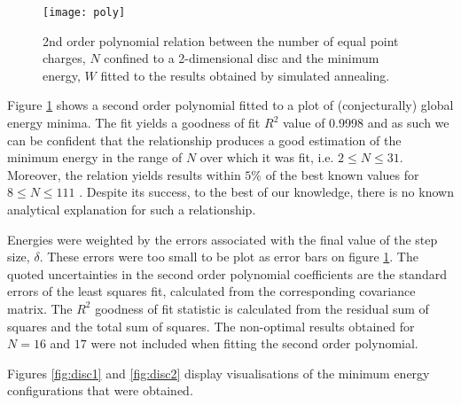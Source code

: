\documentclass[12pt,a4paper,final]{iopart}
\begin{document}
{\begin{figure}\label{fig:polyplot}
\centering
\texttt{[image: poly]}
\caption{2nd order polynomial relation between the number of equal point charges, $N$ confined to a 2-dimensional disc and the minimum energy, $W$ fitted to the results obtained by simulated annealing.} 
\end{figure}

Figure \ref{fig:polyplot} shows a second order polynomial fitted to a plot of (conjecturally) global energy minima.
The fit yields a goodness of fit $R^2$ value of 0.9998 and as such we can be confident that the relationship produces a good estimation of the minimum energy in the range of $N$ over which it was fit, i.e. $2 \leq N \leq 31$. Moreover, the relation  yields results within $5\%$ of the best known values for $ 8 \leq N \leq 111$ \cite{oymak01, worley06,nurmela98}. Despite its success, to the best of our knowledge, there is no known analytical explanation for such a relationship. 

Energies were weighted by the errors associated with the final value of the step size, $\delta$. These errors were too small to be plot as error bars on figure \ref{fig:polyplot}. The quoted uncertainties in the second order polynomial coefficients are the standard errors of the least squares fit, calculated from the corresponding covariance matrix. The $R^2$ goodness of fit statistic is calculated from the residual sum of squares and the total sum of squares. The non-optimal results obtained for $N=16$ and $17$ were not included when fitting the second order polynomial. 

Figures \ref{fig:disc1} and \ref{fig:disc2} display visualisations of the minimum energy configurations that were obtained. 

}
\end{document}
